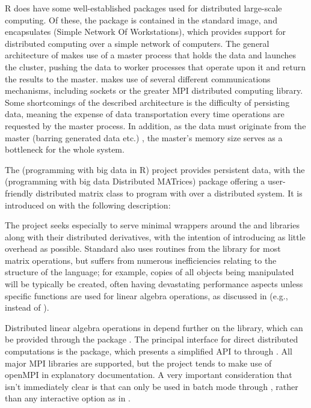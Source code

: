 R does have some well-established packages used for distributed large-scale computing.
Of these, the  package is contained in the standard \R{} image, and encapsulates  (Simple Network Of Workstations), which provides support for distributed computing over a simple network of computers.
The general architecture of  makes use of a master process that holds the data and launches the cluster, pushing the data to worker processes that operate upon it and return the results to the master.
 makes use of
several different communications mechanisms, including sockets or the
greater MPI distributed computing library.
Some shortcomings of the described architecture is the difficulty of persisting data, meaning the expense of data transportation every time operations are requested by the master process.
In addition, as the data must originate from the master (barring generated data etc.)
, the master's memory size serves as
a bottleneck for the whole system.

The  (programming with big data in R) project provides persistent data, with the  (programming with big data Distributed MATrices) package offering a user-friendly distributed matrix class to program with over a distributed system.
It is introduced on with the following description:


The project seeks especially to serve minimal wrappers around the  and  libraries along with their distributed derivatives, with the intention of introducing as little overhead as possible.
Standard \R{} also uses routines from the library for most matrix operations, but suffers from numerous inefficiencies relating to the structure of the language; for example, copies of all objects being manipulated will be typically be created, often having devastating performance aspects unless specific functions are used for linear algebra operations, as discussed in \textcite{schmidt2017programming} (e.g.,  instead of ).

Distributed linear algebra operations in  depend further on the  library, which can be provided through the  package \cite{Chen2012pbdSLAPpackage}.
The principal interface for direct distributed computations is the  package, which presents a simplified API to  through \R{} \cite{Chen2012pbdMPIpackage}.
All major MPI libraries are supported, but the project tends to make use of openMPI in explanatory documentation.
A very important consideration that isn't immediately clear is that  can only be used in batch mode through , rather than any interactive option as in  \cite{yu02:_rmpi}.

